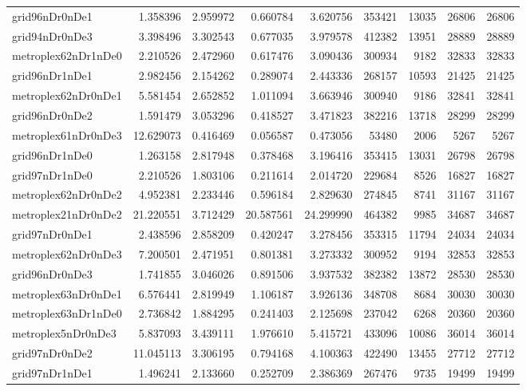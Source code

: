 \begin{longtable}{|l|r|r|r|r|r|r|r|r|}
grid96nDr0nDe1 & 1.358396 & 2.959972 & 0.660784 & 3.620756 & 353421 & 13035 & 26806 & 26806 \\
grid94nDr0nDe3 & 3.398496 & 3.302543 & 0.677035 & 3.979578 & 412382 & 13951 & 28889 & 28889 \\
metroplex62nDr1nDe0 & 2.210526 & 2.472960 & 0.617476 & 3.090436 & 300934 & 9182 & 32833 & 32833 \\
grid96nDr1nDe1 & 2.982456 & 2.154262 & 0.289074 & 2.443336 & 268157 & 10593 & 21425 & 21425 \\
metroplex62nDr0nDe1 & 5.581454 & 2.652852 & 1.011094 & 3.663946 & 300940 & 9186 & 32841 & 32841 \\
grid96nDr0nDe2 & 1.591479 & 3.053296 & 0.418527 & 3.471823 & 382216 & 13718 & 28299 & 28299 \\
metroplex61nDr0nDe3 & 12.629073 & 0.416469 & 0.056587 & 0.473056 & 53480 & 2006 & 5267 & 5267 \\
grid96nDr1nDe0 & 1.263158 & 2.817948 & 0.378468 & 3.196416 & 353415 & 13031 & 26798 & 26798 \\
grid97nDr1nDe0 & 2.210526 & 1.803106 & 0.211614 & 2.014720 & 229684 & 8526 & 16827 & 16827 \\
metroplex62nDr0nDe2 & 4.952381 & 2.233446 & 0.596184 & 2.829630 & 274845 & 8741 & 31167 & 31167 \\
metroplex21nDr0nDe2 & 21.220551 & 3.712429 & 20.587561 & 24.299990 & 464382 & 9985 & 34687 & 34687 \\
grid97nDr0nDe1 & 2.438596 & 2.858209 & 0.420247 & 3.278456 & 353315 & 11794 & 24034 & 24034 \\
metroplex62nDr0nDe3 & 7.200501 & 2.471951 & 0.801381 & 3.273332 & 300952 & 9194 & 32853 & 32853 \\
grid96nDr0nDe3 & 1.741855 & 3.046026 & 0.891506 & 3.937532 & 382382 & 13872 & 28530 & 28530 \\
metroplex63nDr0nDe1 & 6.576441 & 2.819949 & 1.106187 & 3.926136 & 348708 & 8684 & 30030 & 30030 \\
metroplex63nDr1nDe0 & 2.736842 & 1.884295 & 0.241403 & 2.125698 & 237042 & 6268 & 20360 & 20360 \\
metroplex5nDr0nDe3 & 5.837093 & 3.439111 & 1.976610 & 5.415721 & 433096 & 10086 & 36014 & 36014 \\
grid97nDr0nDe2 & 11.045113 & 3.306195 & 0.794168 & 4.100363 & 422490 & 13455 & 27712 & 27712 \\
grid97nDr1nDe1 & 1.496241 & 2.133660 & 0.252709 & 2.386369 & 267476 & 9735 & 19499 & 19499 \\

\end{longtable}
